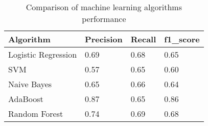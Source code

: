 \begin{table}[]
\centering
\caption{Comparison of machine learning algorithms performance}

\begin{tabular}{|l|l|l|l|}
\hline
\textbf{Algorithm} & \textbf{Precision} & \textbf{Recall} & \textbf{f1\_score} \\ \hline
Logistic Regression & 0.69 & 0.68 & 0.65 \\ \hline
SVM & 0.57 & 0.65 & 0.60 \\ \hline
Naive Bayes & 0.65 & 0.66 & 0.64 \\ \hline
AdaBoost & 0.87 & 0.65 & 0.86 \\ \hline
Random Forest & 0.74 & 0.69 & 0.68 \\ \hline
\end{tabular}

\label{table:ML accuracy}

\end{table}


